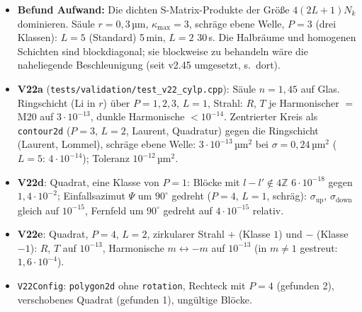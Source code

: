 \begin{itemize}[nosep]
  \item \textbf{Befund Aufwand:} Die dichten S-Matrix-Produkte der Größe $4(2L+1)N_k$ dominieren. Säule $r=0{,}3$\,µm,
        $\kappa_{\max}=3$, schräge ebene Welle, $P=3$ (drei Klassen): $L=5$ (Standard) 5\,min, $L=2$ 30\,s. Die Halbräume und homogenen Schichten sind blockdiagonal; sie blockweise zu behandeln wäre die
        naheliegende Beschleunigung (seit v2.45 umgesetzt, s.\ dort).
  \item \textbf{V22a} (\verb|tests/validation/test_v22_cylp.cpp|): Säule $n=1{,}45$ auf Glas. Ringschicht (Li in $r$) über
        $P=1,2,3$, $L=1$, Strahl: $R$, $T$ je Harmonischer $=$ M20 auf $3\cdot10^{-13}$, dunkle Harmonische
        $<10^{-14}$. Zentrierter Kreis als \verb|contour2d| ($P=3$, $L=2$, Laurent, Quadratur) gegen die
        Ringschicht (Laurent, Lommel), schräge ebene Welle: $3\cdot10^{-13}$\,µm$^2$ bei $\sigma=0{,}24$\,µm$^2$
        ($L=5$: $4\cdot10^{-14}$); Toleranz $10^{-12}$\,µm$^2$.
  \item \textbf{V22d}: Quadrat, eine Klasse von $P=1$: Blöcke mit $l-l'\notin4\mathbb Z$ $6\cdot10^{-18}$ gegen
        $1{,}4\cdot10^{-2}$; Einfallsazimut $\Psi$ um $90^\circ$ gedreht ($P=4$, $L=1$, schräg): $\sigma_{\text{up}}$,
        $\sigma_{\text{down}}$ gleich auf $10^{-15}$, Fernfeld um $90^\circ$ gedreht auf $4\cdot10^{-15}$ relativ.
  \item \textbf{V22e}: Quadrat, $P=4$, $L=2$, zirkularer Strahl $+$ (Klasse $1$) und $-$ (Klasse $-1$): $R$, $T$ auf
        $10^{-13}$, Harmonische $m\leftrightarrow-m$ auf $10^{-13}$ (in $m\ne1$ gestreut: $1{,}6\cdot10^{-4}$).
  \item \verb|V22Config|: \verb|polygon2d| ohne \verb|rotation|, Rechteck mit $P=4$ (gefunden 2), verschobenes Quadrat
        (gefunden 1), ungültige Blöcke.
\end{itemize}

